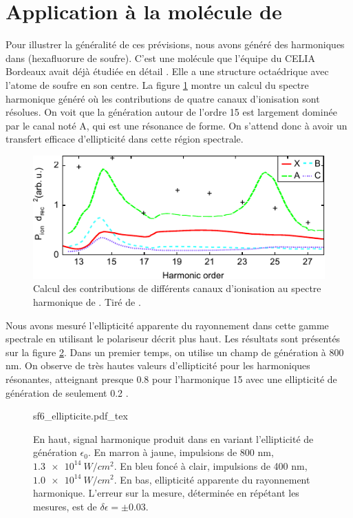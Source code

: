 \section{Application à la molécule de }
\label{sec:sf6ghoe}
Pour illustrer la généralité de ces prévisions, nous avons généré des harmoniques dans  (hexafluorure de soufre). C'est une molécule que l'équipe du CELIA Bordeaux avait déjà étudiée en détail . Elle a une structure octaédrique avec l'atome de soufre en son centre. La figure \ref{fig:sf6_cross_section} montre un calcul du spectre harmonique généré  où les contributions de quatre canaux d'ionisation sont résolues. On voit que la génération autour de l'ordre 15 est largement dominée par le canal noté A, qui est une résonance de forme. On s'attend donc à avoir un transfert efficace d'ellipticité dans cette région spectrale.

\begin{figure}[!ht]
\centering
\includegraphics[width=.75\columnwidth]{Figures/SF6/sf6_channel_contribution.pdf}%
\caption{Calcul des contributions de différents canaux d'ionisation au spectre harmonique de . Tiré de .}
\label{fig:sf6_cross_section}
\end{figure}

Nous avons mesuré l'ellipticité apparente du rayonnement dans cette gamme spectrale en utilisant le polariseur décrit plus haut. Les résultats sont présentés sur la figure \ref{fig:sf6_ell}. Dans un premier temps, on utilise un champ de génération à 800 nm. On observe de très hautes valeurs d'ellipticité pour les harmoniques résonantes, atteignant presque 0.8 pour l'harmonique 15 avec une ellipticité de génération de seulement 0.2 . 

\begin{figure}[!ht]
\centering
\def\svgwidth{1\columnwidth}
{sf6_ellipticite.pdf_tex}
\caption{En haut, signal harmonique produit dans  en variant l'ellipticité de génération $\epsilon_0$. En marron à jaune, impulsions de 800 nm, $\SI{1.3e14}{W/cm^2}$. En bleu foncé à clair, impulsions de 400 nm, $\SI{1.0e14}{W/cm^2}$. En bas, ellipticité apparente du rayonnement harmonique. L'erreur sur la mesure, déterminée en répétant les mesures, est de $\delta\epsilon=\pm0.03$.}
\label{fig:sf6_ell}
\end{figure}

